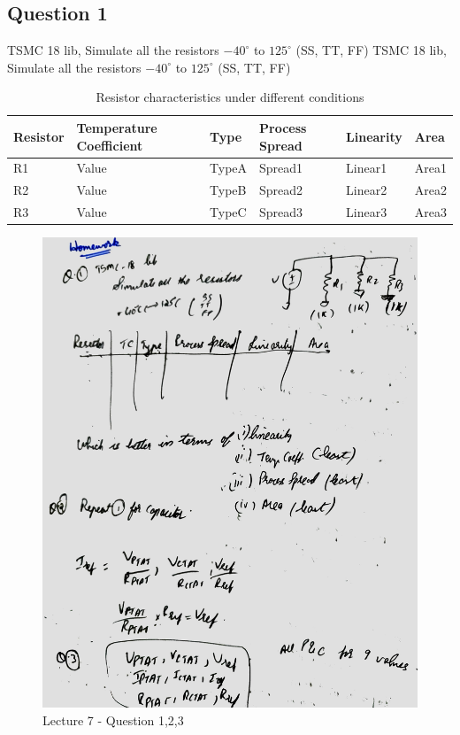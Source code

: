 \documentclass[a4paper]{article}
\begin{document}
\subsection{Question 1}
TSMC 18 lib, Simulate all the resistors $-40^\circ$ to $125^\circ$ (SS, TT, FF)
TSMC 18 lib, Simulate all the resistors $-40^\circ$ to $125^\circ$ (SS, TT, FF)
\begin{table}[ht]
\centering
\begin{tabular}{|l|l|l|l|l|l|}
\hline
Resistor & Temperature Coefficient & Type & Process Spread & Linearity & Area \\
\hline
R1 & Value & TypeA & Spread1 & Linear1 & Area1 \\
R2 & Value & TypeB & Spread2 & Linear2 & Area2 \\
R3 & Value & TypeC & Spread3 & Linear3 & Area3 \\
\hline
\end{tabular}
\caption{Resistor characteristics under different conditions}
\end{table}
\begin{figure}
    \centering
    \includegraphics[width=0.8\linewidth]{images/Lec_7_Q_1_2_3.jpeg}
    \caption{Lecture 7 - Question 1,2,3}
\end{figure}
\end{document}
